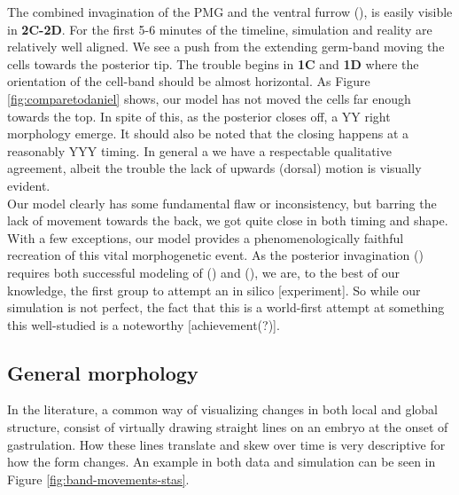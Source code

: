 The combined invagination of the PMG and the ventral furrow (), is easily visible in \textbf{2C-}\textbf{2D}. For the first 5-6 minutes of the timeline, simulation and reality are relatively well aligned. We see a push from the extending germ-band moving the cells towards the posterior tip. The trouble begins in \textbf{1C} and \textbf{1D} where the orientation of the cell-band should be almost horizontal. As Figure \ref{fig:comparetodaniel} shows, our model has not moved the cells far enough towards the top. In spite of this, as the posterior closes off, a YY right morphology emerge. It should also be noted that the closing happens at a reasonably YYY timing. In general a we have a respectable qualitative agreement, albeit the trouble the lack of upwards (dorsal) motion is visually evident.\\



Our model clearly has some fundamental flaw or inconsistency, but barring the lack of movement towards the back, we got quite close in both timing and shape. With a few exceptions, our model provides a phenomenologically faithful recreation of this vital morphogenetic event. As the posterior invagination () requires both successful modeling of () and (), we are, to the best of our knowledge, the first group to attempt an in silico [experiment]. So while our simulation is not perfect, the fact that this is a world-first attempt at something this well-studied is a  noteworthy [achievement(?)].\\

 

\subsection{General morphology}
In the literature, a common way of visualizing changes in both local and global structure, consist of virtually drawing straight lines on an embryo at the onset of gastrulation. How these lines translate and skew over time is very descriptive for how the form changes. An example in both data and simulation can be seen in Figure \ref{fig:band-movements-stas}.

